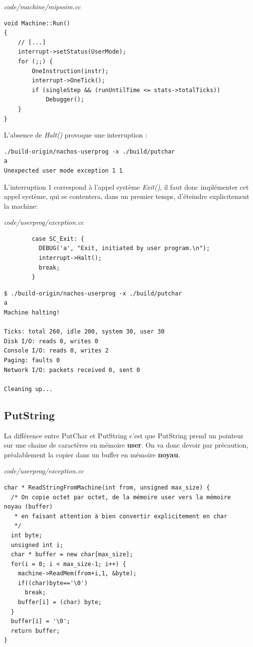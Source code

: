 \documentclass[a4paper,10pt]{article}
\begin{document}
\textit{code/machine/mipssim.cc}
\begin{lstlisting}
void Machine::Run()
{
    // [...]
    interrupt->setStatus(UserMode);
    for (;;) {
        OneInstruction(instr);
        interrupt->OneTick();
        if (singleStep && (runUntilTime <= stats->totalTicks))
            Debugger();
    }
}
\end{lstlisting}

L'absence de \textit{Halt()} provoque une interruption :

\begin{lstlisting}
./build-origin/nachos-userprog -x ./build/putchar
a
Unexpected user mode exception 1 1
\end{lstlisting}

L'interruption 1 correspond à l'appel système \textit{Exit()}, il faut
donc implémenter cet appel système, qui se contentera, dans un premier temps,
d'éteindre explicitement la machine:

\textit{code/userprog/exception.cc}
\begin{lstlisting}
        case SC_Exit: {
          DEBUG('a', "Exit, initiated by user program.\n");
          interrupt->Halt();
          break;
        }
\end{lstlisting}

\begin{lstlisting}
$ ./build-origin/nachos-userprog -x ./build/putchar
a
Machine halting!

Ticks: total 260, idle 200, system 30, user 30
Disk I/O: reads 0, writes 0
Console I/O: reads 0, writes 2
Paging: faults 0
Network I/O: packets received 0, sent 0

Cleaning up...
\end{lstlisting}

\subsection{PutString}
La différence entre PutChar et PutString c'est que PutString prend un pointeur
sur une chaine de caractères en mémoire \textbf{user}. On va donc devoir par
précaution, préalablement la copier dans un buffer en mémoire \textbf{noyau}.

\textit{code/userprog/exception.cc}
\begin{lstlisting}
char * ReadStringFromMachine(int from, unsigned max_size) {
  /* On copie octet par octet, de la mémoire user vers la mémoire noyau (buffer)
   * en faisant attention à bien convertir explicitement en char
   */
  int byte;
  unsigned int i;
  char * buffer = new char[max_size];
  for(i = 0; i < max_size-1; i++) {
    machine->ReadMem(from+i,1, &byte);
    if((char)byte=='\0')
      break;
    buffer[i] = (char) byte;
  }
  buffer[i] = '\0';
  return buffer;
}
\end{lstlisting}
\end{document}
